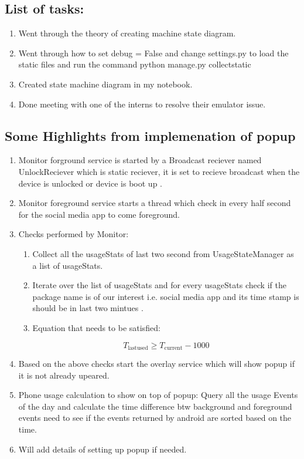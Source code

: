 \documentclass[12pt]{article}
\begin{document}
    \subsection{List of tasks:}
    \begin{enumerate}
        \item Went through the theory of creating machine state diagram.
        \item Went through how to set debug = False and change settings.py to load the static files and run the command python manage.py collectstatic
        \item Created state machine diagram in my notebook.
        \item Done meeting with one of the interns to resolve their emulator issue.
    \end{enumerate}
    \subsection{Some Highlights from implemenation of popup}
    \begin{enumerate}
        \item Monitor forground service is started by a Broadcast reciever named UnlockReciever which is static reciever, it is set to recieve broadcast when the device is unlocked or device is boot up .
        \item Monitor foreground service starts a thread which check in every half second for the social media app to come foreground.
        \item Checks performed by Monitor:
    \begin{enumerate}
    \item Collect all the usageStats of last two second from UsageStateManager as a list of usageStats.
     \item Iterate over the list of usageStats and for every usageStats check if the package name is of our interest i.e. social media app and its time stamp is should be in last two mintues .
     \item Equation that needs to be satisfied: 
     
    \[T_{\text{lastused}}\geq T_{\text{current}} - 1000\]
    \end{enumerate}
    \item Based on the above checks start the overlay service which will show popup if it is not already upeared.
    \item Phone usage calculation to show on top of popup: Query all the usage Events of the day and calculate the time difference btw background and foreground events need to see if the events returned by android are sorted based on the time.
    \item Will add details of setting up popup if needed.
    \end{enumerate}
\end{document}
